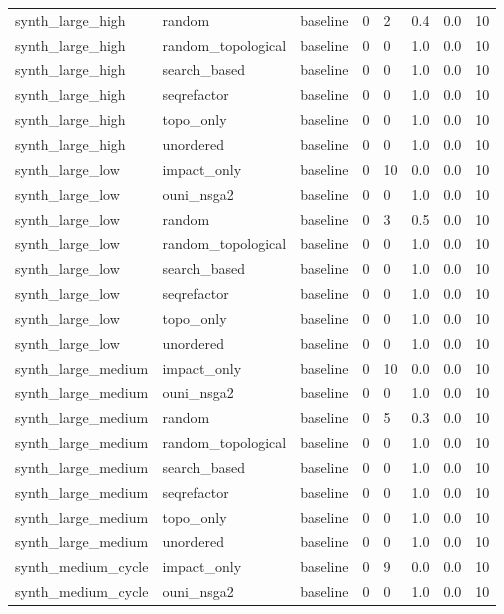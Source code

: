 \begin{table}[t]
\begin{tabular}{llllllll}
synth\_large\_high & random & baseline & 0 & 2 & 0.4 & 0.0 & 10 \\
synth\_large\_high & random\_topological & baseline & 0 & 0 & 1.0 & 0.0 & 10 \\
synth\_large\_high & search\_based & baseline & 0 & 0 & 1.0 & 0.0 & 10 \\
synth\_large\_high & seqrefactor & baseline & 0 & 0 & 1.0 & 0.0 & 10 \\
synth\_large\_high & topo\_only & baseline & 0 & 0 & 1.0 & 0.0 & 10 \\
synth\_large\_high & unordered & baseline & 0 & 0 & 1.0 & 0.0 & 10 \\
synth\_large\_low & impact\_only & baseline & 0 & 10 & 0.0 & 0.0 & 10 \\
synth\_large\_low & ouni\_nsga2 & baseline & 0 & 0 & 1.0 & 0.0 & 10 \\
synth\_large\_low & random & baseline & 0 & 3 & 0.5 & 0.0 & 10 \\
synth\_large\_low & random\_topological & baseline & 0 & 0 & 1.0 & 0.0 & 10 \\
synth\_large\_low & search\_based & baseline & 0 & 0 & 1.0 & 0.0 & 10 \\
synth\_large\_low & seqrefactor & baseline & 0 & 0 & 1.0 & 0.0 & 10 \\
synth\_large\_low & topo\_only & baseline & 0 & 0 & 1.0 & 0.0 & 10 \\
synth\_large\_low & unordered & baseline & 0 & 0 & 1.0 & 0.0 & 10 \\
synth\_large\_medium & impact\_only & baseline & 0 & 10 & 0.0 & 0.0 & 10 \\
synth\_large\_medium & ouni\_nsga2 & baseline & 0 & 0 & 1.0 & 0.0 & 10 \\
synth\_large\_medium & random & baseline & 0 & 5 & 0.3 & 0.0 & 10 \\
synth\_large\_medium & random\_topological & baseline & 0 & 0 & 1.0 & 0.0 & 10 \\
synth\_large\_medium & search\_based & baseline & 0 & 0 & 1.0 & 0.0 & 10 \\
synth\_large\_medium & seqrefactor & baseline & 0 & 0 & 1.0 & 0.0 & 10 \\
synth\_large\_medium & topo\_only & baseline & 0 & 0 & 1.0 & 0.0 & 10 \\
synth\_large\_medium & unordered & baseline & 0 & 0 & 1.0 & 0.0 & 10 \\
synth\_medium\_cycle & impact\_only & baseline & 0 & 9 & 0.0 & 0.0 & 10 \\
synth\_medium\_cycle & ouni\_nsga2 & baseline & 0 & 0 & 1.0 & 0.0 & 10 \\

\end{tabular}
\end{table}
